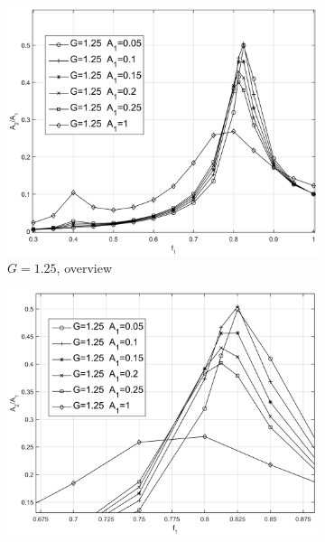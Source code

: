 \begin{figure}[p]	
	\newcommand\widthp{0.5}
	\centering
	\hspace*{\fill}%
	\begin{subfigure}[t]{\widthp\textwidth}
		\centering
		\includegraphics[width=\linewidth]{Figs/G=1.25_A2dA1.png}
		\caption{$ G=1.25 $, overview}
		\label{fig:g125a2da1}
	\end{subfigure}%
	\begin{subfigure}[t]{\widthp\textwidth}
		\centering
		\includegraphics[width=\linewidth]{Figs/G=1.25_A2dA1_details.png}

\end{subfigure}
\end{figure}
